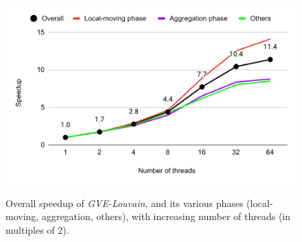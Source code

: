 \begin{figure}[hbtp]
  \centering
  \includegraphics[width=0.98\linewidth]{out/louvain-ss.pdf} \\[0ex]
  \caption{Overall speedup of \textit{GVE-Louvain}, and its various phases (local-moving, aggregation, others), with increasing number of threads (in multiples of 2).}
  \label{fig:louvain-ss}
\end{figure}
